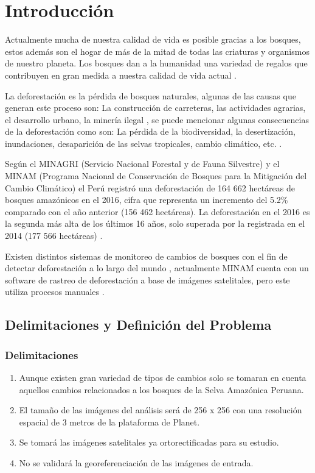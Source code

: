 \chapter{Introducción}
\label{chap:introduccion}
Actualmente mucha de nuestra calidad de vida es posible gracias a los bosques, estos además son el hogar de más de la mitad de todas las criaturas y organismos de nuestro planeta. Los bosques dan a la humanidad una variedad de regalos que contribuyen en gran medida a nuestra calidad de vida actual \cite{balvanera2012servicios}.


La deforestación es la pérdida de bosques naturales, algunas de las causas que generan este proceso son: La construcción de carreteras, las actividades agrarias, el desarrollo urbano, la minería ilegal \cite{fearnside2005deforestation}, se puede mencionar algunas consecuencias de la deforestación como son: La pérdida de la biodiversidad, la desertización, inundaciones, desaparición de las selvas tropicales, cambio climático, etc. \cite{garcia2016deforestation}.


Según el MINAGRI (Servicio Nacional Forestal y de Fauna Silvestre) y el MINAM (Programa Nacional de Conservación de Bosques para la Mitigación del Cambio Climático) el Perú registró una deforestación de 164 662 hectáreas de bosques amazónicos en el 2016, cifra que representa un incremento del 5.2\% comparado con el año anterior (156 462 hectáreas). La deforestación en el 2016 es la segunda más alta de los últimos 16 años, solo superada por la registrada en el 2014 (177 566 hectáreas) \cite{noticia1}.


Existen distintos sistemas de monitoreo de cambios de bosques con el fin de detectar deforestación a lo largo del mundo \cite{MinisteriodelambientedelPeru}, actualmente MINAM cuenta con un software de rastreo de deforestación a base de imágenes satelitales, pero este utiliza procesos manuales \cite{MinisteriodelAmbiente}.



\section{Delimitaciones y Definición del Problema}

\subsection{Delimitaciones}
\begin{enumerate}
    \item Aunque existen gran variedad de tipos de cambios solo se tomaran en cuenta aquellos cambios relacionados a los bosques de la Selva Amazónica Peruana.
    \item El tamaño de las imágenes del análisis será de 256 x 256 con una resolución espacial de 3 metros de la plataforma de Planet.
    \item Se tomará las imágenes satelitales ya ortorectificadas para su estudio.
    \item No se validará la georeferenciación de las imágenes de entrada.
    
\end{enumerate}


